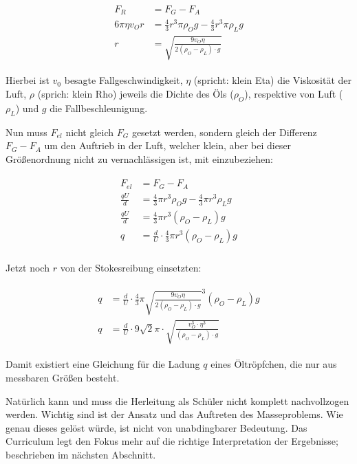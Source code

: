 \begin{align} \label{eq:StokesReibungFuerR}
\begin{split}
	F_R &= F_G - F_A \\
	6 \pi \eta v_O r &= \frac{4}{3} r^3 \pi \rho_{O} g - \frac{4}{3} r^3 \pi \rho_{L} g \\
	r &= \sqrt{\frac{9v_{O}\eta}{2(\rho_{O}-\rho_{L}) \cdot g}}
\end{split}
\end{align}

Hierbei ist $v_{0}$ besagte Fallgeschwindigkeit, $\eta$ (spricht: \glqq klein Eta\grqq) die Viskosität der Luft, $\rho$ (sprich: \glqq klein Rho\grqq) jeweils die Dichte des Öls ($\rho_O$), respektive von Luft ($\rho_L$) und $g$ die Fallbeschleunigung.

Nun muss $F_{el}$ nicht gleich $F_{G}$ gesetzt werden, sondern gleich der Differenz $F_{G} - F_{A}$ um den Auftrieb in der Luft, welcher klein, aber bei dieser Größenordnung nicht zu vernachlässigen ist, mit einzubeziehen:

\begin{align}
\begin{split}
	F_{el} &= F_G - F_A \\
	\frac{qU}{d} &= \frac{4}{3} \pi r^3 \rho_{O} g - \frac{4}{3} \pi r^3\rho_{L} g \\
	\frac{qU}{d} &= \frac{4}{3} \pi  r^3(\rho_{O} - \rho_{L}) g \\
	q &= \frac{d}{U} \cdot \frac{4}{3} \pi r^3 (\rho_{O} - \rho_{L}) g \\
\end{split}
\end{align}

\noindent Jetzt noch $r$ von der Stokesreibung einsetzten:

\begin{align}
\begin{split}
	q &= \frac{d}{U} \cdot \frac{4}{3} \pi \sqrt{\frac{9v_{O}\eta}{2(\rho_{O}-\rho_{L}) \cdot g}}^3 (\rho_{O} - \rho_{L}) g \\
	q &= \frac{d}{U} \cdot 9\sqrt{2} \pi \cdot \sqrt{\frac{v_{O}^3 \cdot \eta^3}{(\rho_O - \rho_L) \cdot g}}
\end{split}
\end{align}

Damit existiert eine Gleichung für die Ladung $q$ eines Öltröpfchen, die nur aus messbaren Größen besteht.

\begin{Anmerkung}
Natürlich kann und muss die Herleitung als Schüler nicht komplett nachvollzogen werden. Wichtig sind ist der Ansatz und das Auftreten des Masseproblems. Wie genau dieses gelöst würde, ist nicht von unabdingbarer Bedeutung. Das Curriculum legt den Fokus mehr auf die richtige Interpretation der Ergebnisse; beschrieben im nächsten Abschnitt.
\end{Anmerkung}


